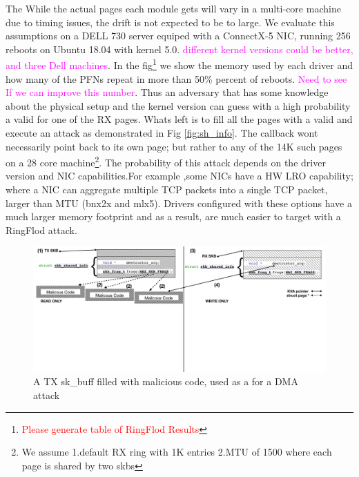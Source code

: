The  While the actual pages each module gets will vary in a multi-core machine due to timing issues, the drift is not expected to be to large. We evaluate this assumptions on a DELL 730 server equiped with a ConnectX-5 NIC, running 256 reboots on Ubuntu 18.04 with kernel 5.0. \textcolor{magenta}{different kernel versions could be better, and three Dell machines}. In the fig\footnote{\textcolor{red}{Please generate table of RingFlod Results}} we show the memory used by each driver and how many of the PFNs repeat in more than 50\% percent of reboots. \textcolor{magenta}{Need to see If we can improve this number}. Thus an adversary that has some knowledge about the physical setup and the kernel version can guess with a high probability a valid \kva for one of the RX pages. Whats left is to fill all the pages with a valid \mabaf and execute an attack as demonstrated in Fig \ref{fig:sh_info}. The callback wont necessarily point back to its own page; but rather to any of the 14K such pages on a 28 core machine\footnote{We assume 1.default RX ring with 1K entries 2.MTU of 1500 where each page is shared by two skbs}. The probability of this attack depends on the driver version and NIC capabilities.For example ,some NICs have a HW LRO capability; where a NIC can aggregate multiple TCP packets into a single TCP packet, larger than MTU \cite{mlx5_lro}(bnx2x and mlx5). Drivers configured with these options have a much larger memory footprint and as a result, are much easier to target with a RingFlod attack.
\begin{figure}[t]
    \centering
    \includegraphics[width=\linewidth]{figs/accomplice.pdf}
    \caption{A TX sk\_buff filled with malicious code, used as a \means for a DMA attack}
    \label{fig:payload}
\end{figure}
